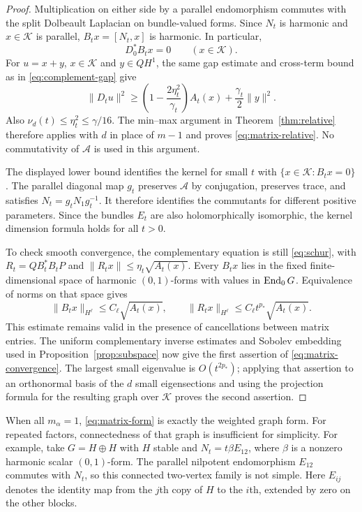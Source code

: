 \begin{proof}
Multiplication on either side by a parallel endomorphism commutes
with the split Dolbeault Laplacian on bundle-valued forms. Since
$N_t$ is harmonic and $x\in\mathcal K$ is parallel, $B_tx=[N_t,x]$
is harmonic. In particular,
\[
 D_0^*B_tx=0\qquad(x\in\mathcal K).
\]
For $u=x+y$, $x\in\mathcal K$ and $y\in QH^1$, the same gap
estimate and cross-term bound as in \eqref{eq:complement-gap} give
\[
 \lVert D_tu\rVert^2
 \ge\left(1-\frac{2\eta_t^2}{\gamma_t}\right)A_t(x)
       +\frac{\gamma_t}{2}\lVert y\rVert^2.
\]
Also $\nu_d(t)\le\eta_t^2\le\gamma/16$. The min--max argument
in Theorem~\ref{thm:relative} therefore applies with $d$ in place
of $m-1$ and proves \eqref{eq:matrix-relative}. No commutativity of
$\mathcal A$ is used in this argument.

The displayed lower bound identifies the kernel for small $t$ with
$\{x\in\mathcal K:B_tx=0\}$. The parallel diagonal map $g_t$
preserves $\mathcal A$ by conjugation, preserves trace, and satisfies
$N_t=g_tN_1g_t^{-1}$. It therefore identifies the commutants for
different positive parameters. Since the bundles $E_t$ are also
holomorphically isomorphic, the kernel dimension formula holds for
all $t>0$.

To check smooth convergence, the complementary equation is still
\eqref{eq:schur}, with
$R_t=QB_t^*B_tP$ and $\lVert R_tx\rVert\le\eta_t\sqrt{A_t(x)}$.
Every $B_tx$ lies in the fixed finite-dimensional space of harmonic
$(0,1)$-forms with values in $\operatorname{End}_0G$. Equivalence of norms on
that space gives
\[
 \lVert B_tx\rVert_{H^\ell}\le C_\ell\sqrt{A_t(x)},\qquad
 \lVert R_tx\rVert_{H^\ell}
       \le C_\ell t^{p_*}\sqrt{A_t(x)}.
\]
This estimate remains valid in the presence of cancellations between
matrix entries. The uniform complementary inverse estimates and
Sobolev embedding used in Proposition~\ref{prop:subspace} now give
the first assertion of \eqref{eq:matrix-convergence}. The largest
small eigenvalue is $O(t^{2p_*})$; applying that assertion to an
orthonormal basis of the $d$ small eigensections and using the
projection formula for the resulting graph over $\mathcal K$
proves the second assertion.
\end{proof}

When all $m_\alpha=1$, \eqref{eq:matrix-form} is exactly the
weighted graph form. For repeated factors, connectedness of that
graph is insufficient for simplicity. For example, take
$G=H\oplus H$ with $H$ stable and
$N_t=t\beta E_{12}$, where $\beta$ is a nonzero harmonic scalar
$(0,1)$-form. The parallel nilpotent endomorphism $E_{12}$ commutes
with $N_t$, so this connected two-vertex family is not simple.
Here $E_{ij}$ denotes the identity map from the $j$th copy of $H$
to the $i$th, extended by zero on the other blocks.

